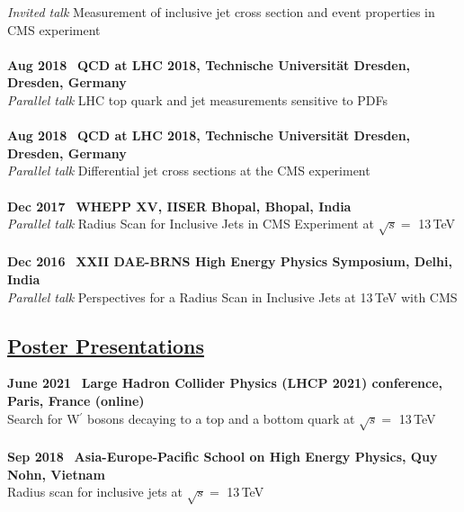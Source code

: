 \documentclass[a4paper,11pt]{article}
\begin{document}
\textit{Invited talk}\hspace{0.5cm}
Measurement of inclusive jet cross section and event properties in CMS experiment \\
\\
\textbf{Aug 2018} \ \textbf{QCD at LHC 2018, Technische Universit{\"a}t Dresden, Dresden, Germany} \\
\textit{Parallel talk}\hspace{0.5cm} 
LHC top quark and jet measurements sensitive to PDFs  \\
\\
\textbf{Aug 2018} \ \textbf{QCD at LHC 2018, Technische Universit{\"a}t Dresden, Dresden, Germany} \\
\textit{Parallel talk}\hspace{0.5cm}
Differential jet cross sections at the CMS experiment \\
\\
\textbf{Dec 2017} \ \textbf{WHEPP XV, IISER Bhopal, Bhopal, India} \\
\textit{Parallel talk}\hspace{0.5cm}
Radius Scan for Inclusive Jets in CMS Experiment at $\sqrt{s} =$ 13\,TeV \\
\\
\textbf{Dec 2016} \ \textbf{XXII DAE-BRNS High Energy Physics Symposium, Delhi, India} \\
\textit{Parallel talk}\hspace{0.5cm}
Perspectives for a Radius Scan in Inclusive Jets at 13\,TeV with CMS  \\

\subsection*{\underline{Poster Presentations}}

\textbf{June 2021} \ \textbf{Large Hadron Collider Physics (LHCP 2021) conference, Paris, France (online)}\\
Search for W$^{\prime}$ bosons decaying to a top and a bottom quark at $\sqrt{s}=$ 13\,TeV\\
\\
\textbf{Sep 2018} \ \textbf{Asia-Europe-Pacific School on High Energy Physics, Quy Nohn, Vietnam}\\
Radius scan for inclusive jets at $\sqrt{s}=$ 13\,TeV\\
\end{document}

